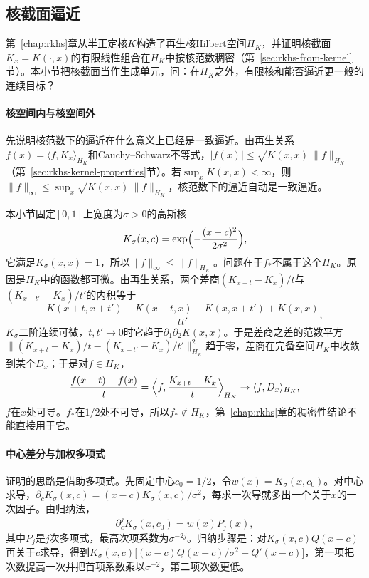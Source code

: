 \subsection{核截面逼近}
\label{sec:apx-kernel-sections}

第~\ref{chap:rkhs}章从半正定核$K$构造了再生核Hilbert空间$H_K$，并证明核截面$K_x=K(\cdot,x)$的有限线性组合在$H_K$中按核范数稠密（第~\ref{sec:rkhs-from-kernel}节）。本小节把核截面当作生成单元，问：在$H_K$之外，有限核和能否逼近更一般的连续目标？

\paragraph{核空间内与核空间外}

先说明核范数下的逼近在什么意义上已经是一致逼近。由再生关系$f(x)=\langle f,K_x\rangle_{H_K}$和Cauchy--Schwarz不等式，$|f(x)|\le\sqrt{K(x,x)}\,\|f\|_{H_K}$（第~\ref{sec:rkhs-kernel-properties}节）。若$\sup_xK(x,x)<\infty$，则$\|f\|_\infty\le\sup_x\sqrt{K(x,x)}\,\|f\|_{H_K}$，核范数下的逼近自动是一致逼近。

本小节固定$[0,1]$上宽度为$\sigma>0$的高斯核
\[
  K_\sigma(x,c)=\exp\Bigl(-\frac{(x-c)^2}{2\sigma^2}\Bigr),
\]
它满足$K_\sigma(x,x)=1$，所以$\|f\|_\infty\le\|f\|_{H_K}$。问题在于$f_*$不属于这个$H_K$。原因是$H_K$中的函数都可微。由再生关系，两个差商$(K_{x+t}-K_x)/t$与$(K_{x+t'}-K_x)/t'$的内积等于
\[
  \frac{K(x+t,x+t')-K(x+t,x)-K(x,x+t')+K(x,x)}{tt'},
\]
$K_\sigma$二阶连续可微，$t,t'\to0$时它趋于$\partial_1\partial_2K(x,x)$。于是差商之差的范数平方$\|(K_{x+t}-K_x)/t-(K_{x+t'}-K_x)/t'\|_{H_K}^2$趋于零，差商在完备空间$H_K$中收敛到某个$D_x$；于是对$f\in H_K$，
\[
  \frac{f(x+t)-f(x)}t=\Bigl\langle f,\frac{K_{x+t}-K_x}t\Bigr\rangle_{H_K}\to\langle f,D_x\rangle_{H_K},
\]
$f$在$x$处可导。$f_*$在$1/2$处不可导，所以$f_*\notin H_K$，第~\ref{chap:rkhs}章的稠密性结论不能直接用于它。

\paragraph{中心差分与加权多项式}

证明的思路是借助多项式。先固定中心$c_0=1/2$，令$w(x)=K_\sigma(x,c_0)$。对中心求导，$\partial_cK_\sigma(x,c)=(x-c)K_\sigma(x,c)/\sigma^2$，每求一次导就多出一个关于$x$的一次因子。由归纳法，
\begin{equation}
  \partial_c^jK_\sigma(x,c_0)=w(x)P_j(x),
  \label{eq:apx-gaussian-derivative}
\end{equation}
其中$P_j$是$j$次多项式，最高次项系数为$\sigma^{-2j}$。归纳步骤是：对$K_\sigma(x,c)Q(x-c)$再关于$c$求导，得到$K_\sigma(x,c)\bigl[(x-c)Q(x-c)/\sigma^2-Q'(x-c)\bigr]$，第一项把次数提高一次并把首项系数乘以$\sigma^{-2}$，第二项次数更低。

